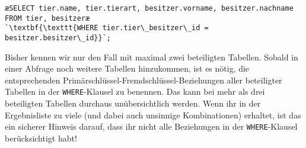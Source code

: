 \begin{lstlisting}
æSELECT tier.name, tier.tierart, besitzer.vorname, besitzer.nachname
FROM tier, besitzeræ
`\textbf{\texttt{WHERE tier.tier\_besitzer\_id = besitzer.besitzer\_id}}`;
\end{lstlisting}

Bisher kennen wir nur den Fall mit maximal zwei beteiligten Tabellen. Sobald in
einer Abfrage noch weitere Tabellen hinzukommen, ist es nötig, die
entsprechenden Primärschlüssel-Fremdschlüssel-Beziehungen aller beteiligter
Tabellen in der \lstinline|WHERE|-Klausel zu benennen. Das kann bei mehr als
drei beteiligten Tabellen durchaus unübersichtlich werden. Wenn ihr in der
Ergebnisliste zu viele (und dabei auch unsinnige Kombinationen) erhaltet, ist
das ein sicherer Hinweis darauf, dass ihr nicht alle Beziehungen in der
\lstinline|WHERE|-Klausel berücksichtigt habt!

